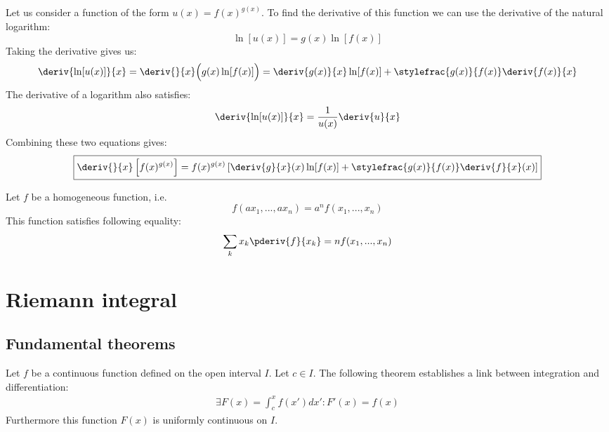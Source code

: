 	\begin{method}
		Let us consider a function of the form $u(x)=f(x)^{g(x)}$. To find the derivative of this function we can use the derivative of the natural logarithm: \[\ln[u(x)] = g(x)\ln[f(x)]\] Taking the derivative gives us: \[\deriv{\ln[u(x)]}{x} = \deriv{}{x}\Big(g(x)\ln[f(x)]\Big) = \deriv{g(x)}{x}\ln[f(x)] + \stylefrac{g(x)}{f(x)}\deriv{f(x)}{x}\] The derivative of a logarithm also satisfies: \[\deriv{\ln[u(x)]}{x} = \frac{1}{u(x)}\deriv{u}{x}\] Combining these two equations gives:
		\begin{gather}
			\label{calculus:derivative_f^g}
			\boxed{\deriv{}{x}\left[f(x)^{g(x)}\right] = f(x)^{g(x)}\left[\deriv{g}{x}(x)\ln[f(x)] + \stylefrac{g(x)}{f(x)}\deriv{f}{x}(x)\right]}
		\end{gather}
	\end{method}
	
	\begin{theorem}[Euler]
		Let $f$ be a homogeneous function, i.e. \[f(ax_1, ..., ax_n) = a^nf(x_1, ..., x_n)\] This function satisfies following equality:
		\begin{gather}
			\label{calculus:theorem:euler_homogeneous_functions}
			\sum_kx_k\pderiv{f}{x_k} = nf(x_1, ..., x_n)
		\end{gather}
	\end{theorem}

\section{Riemann integral}


\subsection{Fundamental theorems}
    
	\begin{theorem}
		Let $f$ be a continuous  function defined on the open interval $I$. Let $c \in I$. The following theorem establishes a link between integration and differentiation:
		\begin{gather}
			\label{calculus:first_fundamental_theorem}
        	        \boxed{\exists F(x) = \int_c^xf(x')dx':F'(x) = f(x)}
		\end{gather}
		Furthermore this function $F(x)$ is uniformly continuous on $I$.
	\end{theorem}
        
